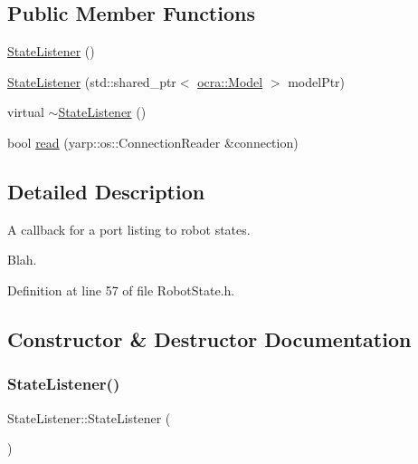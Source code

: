 \subsection*{Public Member Functions}
\begin{DoxyCompactItemize}
\item 
\hyperlink{classocra__recipes_1_1StateListener_ab2d5128398eeb9990f34a633e9a4e181}{State\+Listener} ()
\item 
\hyperlink{classocra__recipes_1_1StateListener_a6861fabf2b226ce71ba2bcfa766a4538}{State\+Listener} (std\+::shared\+\_\+ptr$<$ \hyperlink{classocra_1_1Model}{ocra\+::\+Model} $>$ model\+Ptr)
\item 
virtual \hyperlink{classocra__recipes_1_1StateListener_a84961512f9533cc039ca2deefbabbb73}{$\sim$\+State\+Listener} ()
\item 
bool \hyperlink{classocra__recipes_1_1StateListener_a10196cebd253c4b98fb39371c95cc68a}{read} (yarp\+::os\+::\+Connection\+Reader \&connection)
\end{DoxyCompactItemize}


\subsection{Detailed Description}
A callback for a port listing to robot states. 

Blah. 

Definition at line 57 of file Robot\+State.\+h.



\subsection{Constructor \& Destructor Documentation}
\hypertarget{classocra__recipes_1_1StateListener_ab2d5128398eeb9990f34a633e9a4e181}{}\label{classocra__recipes_1_1StateListener_ab2d5128398eeb9990f34a633e9a4e181} 
\subsubsection{\texorpdfstring{State\+Listener()}{StateListener()}\hspace{0.1cm}{\footnotesize\ttfamily [1/2]}}
{\footnotesize\ttfamily State\+Listener\+::\+State\+Listener (\begin{DoxyParamCaption}{ }\end{DoxyParamCaption})}



